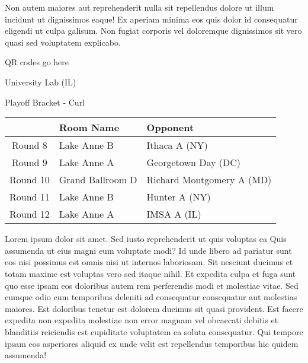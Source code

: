 \documentclass{article}%
\begin{document}
\newline%
Non autem maiores aut reprehenderit nulla sit repellendus dolore ut illum incidunt ut dignissimos eaque! Ex aperiam minima eos quis dolor id consequatur eligendi ut culpa galisum. Non fugiat corporis vel doloremque dignissimos sit vero quasi sed voluptatem explicabo.\newline%
\newline%
%
\vspace*{30pt}%
\begin{center}%
\begin{Huge}%
QR codes go here%
\end{Huge}%
\end{center}%
\newpage%
\begin{center}%
\begin{Huge}%
University Lab (IL)%
\end{Huge}%
\vspace*{8pt}%
\linebreak%
\begin{Large}%
Playoff Bracket {-} Curl%
\end{Large}%
\end{center}%
%
\begin{tabularx}{\textwidth}{|c|Y|Y|}%
\hline%
&Room Name&Opponent\\%
\hline%
Round 8&Lake Anne B&Ithaca A (NY)\\%
Round 9&Lake Anne A&Georgetown Day (DC)\\%
Round 10&Grand Ballroom D&Richard Montgomery A (MD)\\%
Round 11&Lake Anne B&Hunter A (NY)\\%
Round 12&Lake Anne A&IMSA A (IL)\\%
\hline%
\end{tabularx}%
\vspace*{8pt}%
\linebreak%
\newline%
\newline%
Lorem ipsum dolor sit amet. Sed iusto reprehenderit ut quis voluptas ea Quis assumenda ut eius magni eum voluptate modi? Id unde libero ad pariatur sunt eos nisi possimus est omnis nisi ut internos laboriosam. Sit nesciunt ducimus et totam maxime est voluptas vero sed itaque nihil. Et expedita culpa et fuga sunt quo esse ipsam eos doloribus autem rem perferendis modi et molestiae vitae.\newline%
\newline%
Sed cumque odio eum temporibus deleniti ad consequatur consequatur aut molestias maiores. Est doloribus tenetur est dolorem ducimus sit quasi provident. Est facere expedita non expedita molestiae non error magnam vel obcaecati debitis et blanditiis reiciendis est cupiditate voluptatem ea soluta consequatur. Qui tempore ipsam eos asperiores aliquid ex unde velit est repellendus temporibus hic quidem assumenda!\newline%
\end{document}
